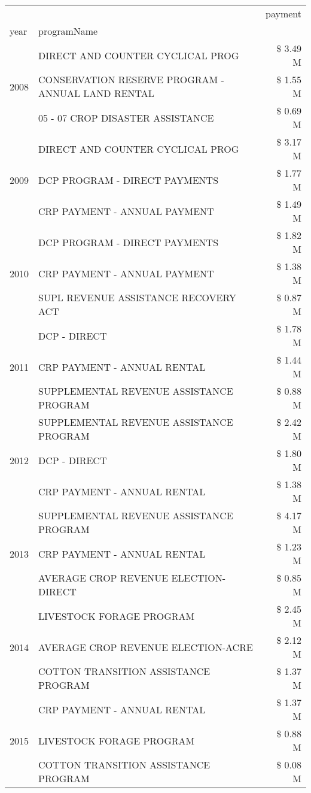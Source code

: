 \begin{tabular}{llr}
\toprule
 &  & payment \\
year & programName &  \\
\midrule
\multirow[t]{3}{*}{2008} & DIRECT AND COUNTER CYCLICAL PROG & \$ 3.49 M \\
 & CONSERVATION RESERVE PROGRAM - ANNUAL LAND RENTAL & \$ 1.55 M \\
 & 05 - 07 CROP DISASTER ASSISTANCE & \$ 0.69 M \\
\cline{1-3}
\multirow[t]{3}{*}{2009} & DIRECT AND COUNTER CYCLICAL PROG & \$ 3.17 M \\
 & DCP PROGRAM - DIRECT PAYMENTS & \$ 1.77 M \\
 & CRP PAYMENT - ANNUAL PAYMENT & \$ 1.49 M \\
\cline{1-3}
\multirow[t]{3}{*}{2010} & DCP PROGRAM - DIRECT PAYMENTS & \$ 1.82 M \\
 & CRP PAYMENT - ANNUAL PAYMENT & \$ 1.38 M \\
 & SUPL REVENUE ASSISTANCE RECOVERY ACT & \$ 0.87 M \\
\cline{1-3}
\multirow[t]{3}{*}{2011} & DCP - DIRECT & \$ 1.78 M \\
 & CRP PAYMENT - ANNUAL RENTAL & \$ 1.44 M \\
 & SUPPLEMENTAL REVENUE ASSISTANCE PROGRAM & \$ 0.88 M \\
\cline{1-3}
\multirow[t]{3}{*}{2012} & SUPPLEMENTAL REVENUE ASSISTANCE PROGRAM & \$ 2.42 M \\
 & DCP - DIRECT & \$ 1.80 M \\
 & CRP PAYMENT - ANNUAL RENTAL & \$ 1.38 M \\
\cline{1-3}
\multirow[t]{3}{*}{2013} & SUPPLEMENTAL REVENUE ASSISTANCE PROGRAM & \$ 4.17 M \\
 & CRP PAYMENT - ANNUAL RENTAL & \$ 1.23 M \\
 & AVERAGE CROP REVENUE ELECTION-DIRECT & \$ 0.85 M \\
\cline{1-3}
\multirow[t]{3}{*}{2014} & LIVESTOCK FORAGE PROGRAM & \$ 2.45 M \\
 & AVERAGE CROP REVENUE ELECTION-ACRE & \$ 2.12 M \\
 & COTTON TRANSITION ASSISTANCE PROGRAM & \$ 1.37 M \\
\cline{1-3}
\multirow[t]{3}{*}{2015} & CRP PAYMENT - ANNUAL RENTAL & \$ 1.37 M \\
 & LIVESTOCK FORAGE PROGRAM & \$ 0.88 M \\
 & COTTON TRANSITION ASSISTANCE PROGRAM & \$ 0.08 M \\

\end{tabular}

